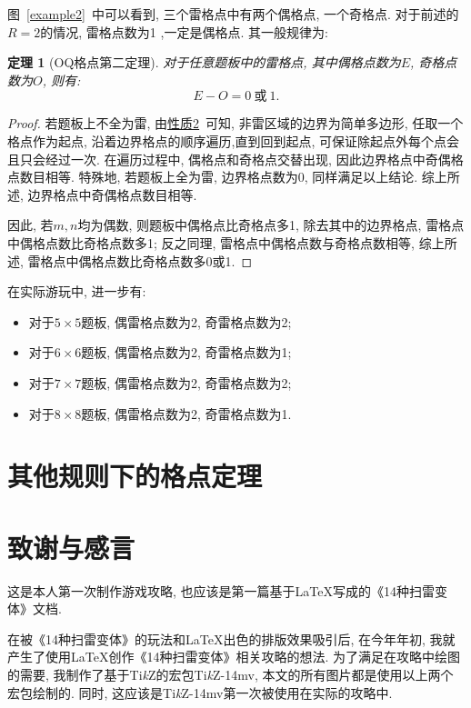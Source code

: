 \documentclass{ctexart}
\newcommand{\varible}[1]{{\Noto[#1]}}
\newtheorem{theorem}{定理}
\begin{document}
图\ \ref{example2}\ 中可以看到, 三个雷格点中有两个偶格点, 一个奇格点. 对于前述的$R = 2$的情况, 雷格点数为1 ,一定是偶格点. 其一般规律为:
\begin{theorem}[OQ格点第二定理]
    对于任意\varible{O}\varible{Q}题板中的雷格点, 其中偶格点数为$E$, 奇格点数为$O$, 则有:
    \begin{equation}
        E - O = 0\ \text{或}\ 1.
    \end{equation}    
\end{theorem}
\begin{proof}
    若题板上不全为雷, 由\hyperref[p2]{性质2}\ 可知, 非雷区域的边界为简单多边形, 任取一个格点作为起点, 沿着边界格点的顺序遍历,直到回到起点, 可保证除起点外每个点会且只会经过一次. 在遍历过程中, 偶格点和奇格点交替出现, 因此边界格点中奇偶格点数目相等. 特殊地, 若题板上全为雷, 边界格点数为0, 同样满足以上结论. 综上所述, 边界格点中奇偶格点数目相等.

    因此, 若$m,n$均为偶数, 则题板中偶格点比奇格点多1, 除去其中的边界格点, 雷格点中偶格点数比奇格点数多1; 反之同理, 雷格点中偶格点数与奇格点数相等, 综上所述, 雷格点中偶格点数比奇格点数多0或1.
\end{proof}

在实际游玩中, 进一步有:
\begin{itemize}
    \item 对于$5\times5$题板, 偶雷格点数为2, 奇雷格点数为2;
    \item 对于$6\times6$题板, 偶雷格点数为2, 奇雷格点数为1;
    \item 对于$7\times7$题板, 偶雷格点数为2, 奇雷格点数为2;
    \item 对于$8\times8$题板, 偶雷格点数为2, 奇雷格点数为1.
\end{itemize}

\section{其他规则下的格点定理}

\section{致谢与感言}
这是本人第一次制作游戏攻略, 也应该是第一篇基于\LaTeX 写成的《14种扫雷变体》文档. 

在被《14种扫雷变体》的玩法和\LaTeX 出色的排版效果吸引后, 在今年年初, 我就产生了使用\LaTeX 创作《14种扫雷变体》相关攻略的想法. 为了满足在攻略中绘图的需要, 我制作了基于Ti\emph{k}Z的宏包Ti\emph{k}Z-14mv, 本文的所有图片都是使用以上两个宏包绘制的. 同时, 这应该是Ti\emph{k}Z-14mv第一次被使用在实际的攻略中.
\end{document}
